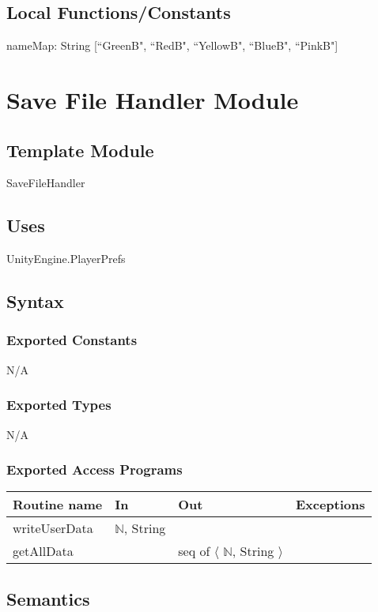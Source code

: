 \documentclass[12pt]{article}
\begin{document}
\subsection{Local Functions/Constants}
nameMap: String [``GreenB", ``RedB", ``YellowB", ``BlueB", ``PinkB"]


\newpage

\section {Save File Handler Module}

\subsection{Template Module}
SaveFileHandler

\subsection {Uses}
UnityEngine.PlayerPrefs

\subsection {Syntax}

\subsubsection {Exported Constants}
N/A
\subsubsection {Exported Types}
N/A
\subsubsection {Exported Access Programs}

\begin{tabular}{| l | l | l | l |}
\hline
\textbf{Routine name} & \textbf{In} & \textbf{Out} & \textbf{Exceptions}\\
\hline
writeUserData    &  $\mathbb{N}$, String        &           &          \\
\hline
getAllData    &          &    seq of $\langle$ $\mathbb{N}$, String $\rangle$       &          \\
\hline
\end{tabular}

\subsection {Semantics}
\end{document}
